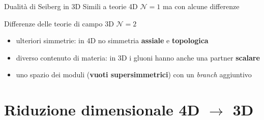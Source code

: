 \documentclass[10pt,compress,usenames,dvipsnames]{beamer}
\begin{document}
\begin{frame}{Dualità di Seiberg in 3D}
Simili a teorie 4D $\mathcal{N}=1$ ma con alcune differenze
\begin{block}{Differenze delle teorie di campo 3D $\mathcal{N}=2$}
\begin{itemize}
\item ulteriori simmetrie: in 4D no simmetria \alert{\bfseries assiale} e \alert{\bfseries topologica} 
\item diverso contenuto di materia: in 3D i gluoni hanno anche una partner \alert{\bfseries scalare} 
\item uno spazio dei moduli (\alert{\bfseries vuoti supersimmetrici}) con un \emph{branch} aggiuntivo  
\end{itemize}
\end{block}
\begin{center}
\end{center}

\end{frame}



\section{Riduzione dimensionale 4D $ \rightarrow$ 3D}
\end{document}
